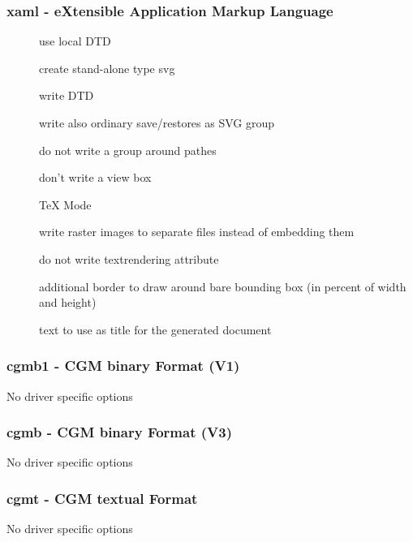 \documentclass[english,a4paper]{article}
\begin{document}
\subsubsection{xaml - eXtensible Application Markup Language}
\begin{description}
\item[] 
use local DTD


\item[] 
create stand-alone type svg


\item[] 
write DTD


\item[] 
write also ordinary save/restores as SVG group


\item[] 
do not write a group around pathes


\item[] 
don't write a view box


\item[] 
TeX Mode


\item[] 
write raster images to separate files instead of embedding them


\item[] 
do not write textrendering attribute


\item[] 
additional border to draw around bare bounding box (in percent of width and height)


\item[] 
text to use as title for the generated document


\end{description}
\subsubsection{cgmb1 - CGM binary Format (V1)}
No driver specific options
\subsubsection{cgmb - CGM binary Format (V3)}
No driver specific options
\subsubsection{cgmt - CGM textual Format}
No driver specific options
\end{document}
